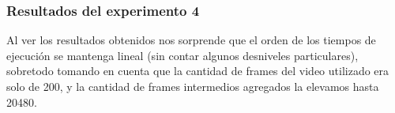 \subsubsection{Resultados del experimento 4}
\begin{figure}[ht]
	\begin{center}
	\end{center}
\end{figure}
\par Al ver los resultados obtenidos nos sorprende que el orden de los tiempos de ejecuci\'on se mantenga lineal (sin contar algunos desniveles particulares), sobretodo tomando en cuenta que la cantidad de frames del video utilizado era solo de 200, y la cantidad de frames intermedios agregados la elevamos hasta 20480. 